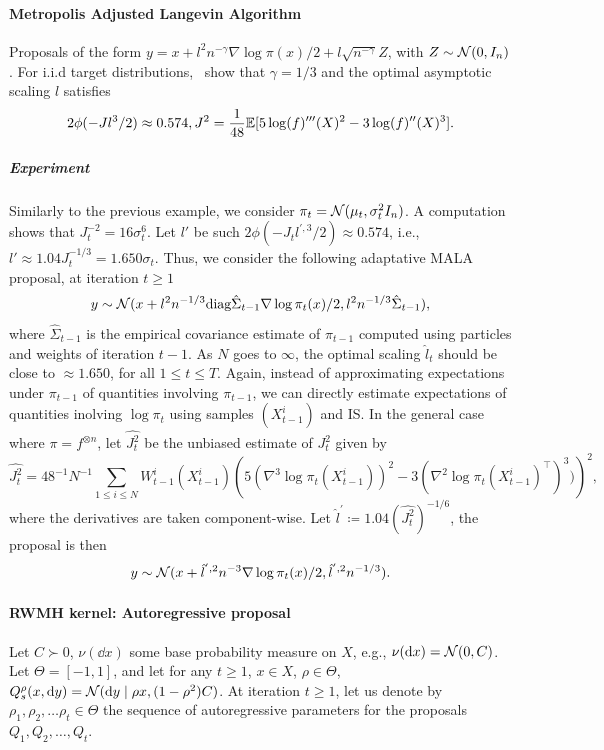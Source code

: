 \paragraph{Metropolis Adjusted Langevin Algorithm}
Proposals of the form $y=x + l^2n^{-\gamma}\nabla \log\pi(x) /2 + l\sqrt{n^{-\gamma}}Z$, with $Z\sim\mathcal{N}(0, I_n)$.
For i.i.d target distributions,~\citet{garethrosenthal98} show that $\gamma=1/3$ and the optimal asymptotic scaling $l$ satisfies
\begin{equation}
    2\phi(-Jl^3/2)\approx 0.574, J^2= \frac{1}{48}\mathbb{E}[5\log(f)'''(X)^2 - 3\log(f)''(X)^3].
\end{equation}

\subparagraph{Experiment}
Similarly to the previous example, we consider $\pi_t = \mathcal{N}(\mu_t, \sigma_t^2 I_n)$.
A computation shows that $J^{-2}_t = 16\sigma_t^6$. Let $l'$ be such $2\phi(-J_tl^{',3}/2)\approx 0.574$, i.e., $l'\approx 1.04J_t^{-1/3} = 1.650\sigma_t$.
Thus, we consider the following adaptative MALA proposal, at iteration $t\geq 1$
\begin{equation}
    \label{eq:mala_adaptative_smc}
    y \sim \mathcal{N}(x + l^2 n^{-1/3} \textup{diag}\hat{\Sigma}_{t-1} \nabla \log\pi_{t}(x)/2, l^2n^{-1/3}\hat{\Sigma}_{t-1}),
\end{equation}
where $\hat{\Sigma}_{t-1}$ is the empirical covariance estimate of $\pi_{t-1}$ computed using particles and weights of iteration $t-1$.
As $N$ goes to $\infty$, the optimal scaling $\hat{l}_{t}$ should be close to $\approx 1.650$, for all $1\leq t\leq T$.
Again, instead of approximating expectations under $\pi_{t-1}$ of quantities involving $\pi_{t-1}$, we can directly estimate expectations of quantities inolving $\log \pi_{t}$ using samples $(X_{t-1}^{i})$ and IS.
In the general case where $\pi = f^{\otimes n}$, let $\hat{J^2_t}$ be the unbiased estimate of $J_t^2$ given by
\begin{equation}
    \hat{J_t^2} = 48^{-1}N^{-1}\sum_{1\leq i\leq N}W_{t-1}^{i}(X_{t-1}^{i})\left(5 (\nabla^3 \log \pi_t(X_{t-1}^{i}))^{2} - 3(\nabla^{2} \log \pi_t(X_{t-1}^{i})^{\top})^{3})\right)^2,
\end{equation}
where the derivatives are taken component-wise.
Let $\hat{l}^{'}\coloneq 1.04(\hat{J^2_t})^{-1/6}$, the proposal is then
\begin{equation}
    y\sim \mathcal{N}(x + \hat{l}^{',2} n^{-3} \nabla \log \pi_t(x)/2, \hat{l}^{', 2}n^{-1/3}).
\end{equation}

\paragraph{RWMH kernel: Autoregressive proposal}
\label{subsec:ar_proposal}
Let $C \succ 0$, $\nu(\dd x)$ some base probability measure on $X$, e.g., $\nu(\mathrm{d} x) = \mathcal{N}(0, C)$.
Let $\Theta = [-1, 1]$, and let for any $t\geq 1$, $x\in X$, $\rho \in \Theta$, $Q_s^{\rho}(x, \mathrm{d} y) = \mathcal{N}(\mathrm{d} y \mid \rho x, (1-\rho^2)C)$.
At iteration $t\geq 1$, let us denote by $\rho_1, \rho_2, \ldots \rho_{t} \in \Theta$ the sequence of autoregressive parameters for the proposals $Q_1, Q_2, \ldots, Q_{t}$.

